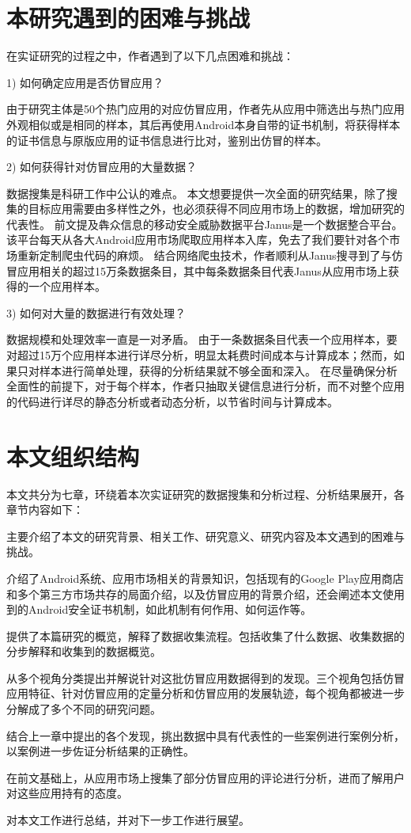 \section{本研究遇到的困难与挑战}
在实证研究的过程之中，作者遇到了以下几点困难和挑战：

1)	如何确定应用是否仿冒应用？

由于研究主体是50个热门应用的对应仿冒应用，作者先从应用中筛选出与热门应用外观相似或是相同的样本，其后再使用Android本身自带的证书机制，将获得样本的证书信息与原版应用的证书信息进行比对，鉴别出仿冒的样本。

2)	如何获得针对仿冒应用的大量数据？

数据搜集是科研工作中公认的难点。
本文想要提供一次全面的研究结果，除了搜集的目标应用需要由多样性之外，也必须获得不同应用市场上的数据，增加研究的代表性。
前文提及犇众信息的移动安全威胁数据平台Janus是一个数据整合平台。该平台每天从各大Android应用市场爬取应用样本入库，免去了我们要针对各个市场重新定制爬虫代码的麻烦。
结合网络爬虫技术，作者顺利从Janus搜寻到了与仿冒应用相关的超过15万条数据条目，其中每条数据条目代表Janus从应用市场上获得的一个应用样本。

3)	如何对大量的数据进行有效处理？

数据规模和处理效率一直是一对矛盾。
由于一条数据条目代表一个应用样本，要对超过15万个应用样本进行详尽分析，明显太耗费时间成本与计算成本；然而，如果只对样本进行简单处理，获得的分析结果就不够全面和深入。
在尽量确保分析全面性的前提下，对于每个样本，作者只抽取关键信息进行分析，而不对整个应用的代码进行详尽的静态分析或者动态分析，以节省时间与计算成本。


\section{本文组织结构}
本文共分为七章，环绕着本次实证研究的数据搜集和分析过程、分析结果展开，各章节内容如下：

主要介绍了本文的研究背景、相关工作、研究意义、研究内容及本文遇到的困难与挑战。

介绍了Android系统、应用市场相关的背景知识，包括现有的Google Play应用商店和多个第三方市场共存的局面介绍，以及仿冒应用的背景介绍，还会阐述本文使用到的Android安全证书机制，如此机制有何作用、如何运作等。

提供了本篇研究的概览，解释了数据收集流程。包括收集了什么数据、收集数据的分步解释和收集到的数据概览。

从多个视角分类提出并解说针对这批仿冒应用数据得到的发现。三个视角包括仿冒应用特征、针对仿冒应用的定量分析和仿冒应用的发展轨迹，每个视角都被进一步分解成了多个不同的研究问题。

结合上一章中提出的各个发现，挑出数据中具有代表性的一些案例进行案例分析，以案例进一步佐证分析结果的正确性。

在前文基础上，从应用市场上搜集了部分仿冒应用的评论进行分析，进而了解用户对这些应用持有的态度。

对本文工作进行总结，并对下一步工作进行展望。
